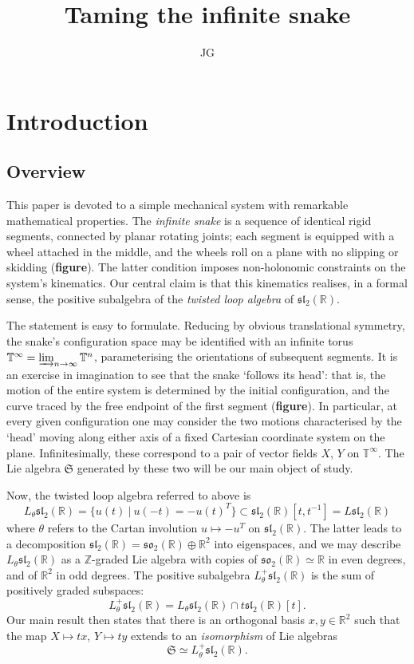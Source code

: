 \documentclass{article}
\title{Taming the infinite snake}
\author{JG}
\def\fsl{\mathfrak{sl}}
\def\fso{\mathfrak{so}}
\def\fS{\mathfrak{S}}
\def\ZZ{\mathbb{Z}}
\def\RR{\mathbb{R}}
\def\TT{\mathbb{T}}
\theoremstyle{definition}
\begin{document}
\sloppy\maketitle

\section{Introduction}
\label{sec:intro}
\subsection{Overview}
This paper is devoted to a simple mechanical
system with remarkable mathematical properties.
The \emph{infinite snake} is a sequence of 
identical rigid segments, connected by
planar rotating joints; each segment is
equipped with a wheel attached in the middle,
and the wheels roll 
on a plane with no slipping
or skidding (\textbf{figure}). The latter condition 
imposes non-holonomic constraints on the system's kinematics.
Our central claim is that
this kinematics realises, in a formal sense, the positive
subalgebra of the 
\emph{twisted loop algebra} of $\fsl_2(\RR)$. 

The statement is easy to formulate. Reducing by obvious translational
symmetry, the snake's configuration space may be identified with an
infinite torus $\TT^\infty = \varinjlim_{n\to\infty} \TT^n$, parameterising
the orientations of subsequent segments.
It is an exercise in imagination to see that the snake `follows its head':
that is, the motion of the entire system is determined by the initial configuration,
and the curve traced by the free endpoint of the first segment (\textbf{figure}). 
In particular, at every given configuration one may consider the two motions characterised
by the `head' moving along either axis of a fixed Cartesian coordinate system on the plane.
Infinitesimally, these correspond to a pair of vector fields $X$, $Y$ on $\TT^\infty$.
The Lie algebra $\fS$ generated by these two will be our main object of study.

Now, the twisted loop algebra referred to above is
$$
L_\theta\fsl_2(\RR) = \{ u(t)\ |\ u(-t)=-u(t)^T \} \subset \fsl_2(\RR)[t,t^{-1}] = L\fsl_2(\RR)
$$
where $\theta$ refers to the Cartan involution $u \mapsto -u^T$ on $\fsl_2(\RR)$.
The latter leads to a decomposition $\fsl_2(\RR) = \fso_2(\RR) \oplus \RR^2$ into eigenspaces,
and we may describe $L_\theta\fsl_2(\RR)$ as a $\ZZ$-graded Lie algebra with copies of 
$\fso_2(\RR)\simeq\RR$ in even degrees, and of $\RR^2$ in odd degrees.
The positive subalgebra $L_\theta^+\fsl_2(\RR)$ is the sum of positively graded subspaces:
$$
L_\theta^+\fsl_2(\RR) = L_\theta\fsl_2(\RR) \cap t \fsl_2(\RR)[t].
$$
Our main result then states that there is an orthogonal
basis $x,y\in\RR^2$ such that the map $X\mapsto tx$, $Y\mapsto ty$
extends to an \emph{isomorphism} of Lie algebras
$$\fS \simeq L_\theta^+\fsl_2(\RR). $$
\end{document}

